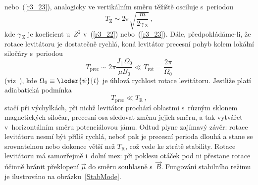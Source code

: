 nebo~(\ref{r3_23}), analogicky ve vertikálním směru těžiště osciluje
s~periodou
\begin{equation}
  T_{\mathrm{Z}}\sim 2\pi\sqrt{\frac{m}{2\gamma\,_{\mathrm{Z}}}}\,,    \label{r3_26}
\end{equation}
kde $\gamma\,_{\mathrm{Z}}$ je koeficient u~$Z^2$ v~(\ref{r3_22})
nebo~(\ref{r3_23}). Dále, předpokládáme-li, že rotace levitátoru je dostatečně
rychlá, koná levitátor precesní pohyb kolem lokální siločáry s~periodou
\begin{equation}
  T_{\mathrm{prec}} \sim 2\pi\frac{J_\parallel\,\Omega_0}{\mu B_0} \ll
  T_{\mathrm{rot}}= \frac{2\pi}{\Omega_{0}}                           \label{r3_27}
\end{equation}
(viz~\cite{Gol-Poo-Saf:2002:ClassMech:3}), kde $\Omega_0\equiv\loder{\psi}{t}$
je úhlová rychlost rotace levitátoru. Jestliže platí adiabatická podmínka
\begin{equation}
  T_{\mathrm{prec}} \ll T_{\mathrm{R}}\,,                                \label{r3_28}
\end{equation}
stačí při výchylkách, při nichž levitátor prochází oblastmi s~různým sklonem
magnetických siločar, precesní osa sledovat změnu jejich směru, a tak vytvářet
v~horizontálním směru potenciálovou jámu. Odtud plyne zajímavý závěr: rotace
levitátoru nesmí být příliš rychlá, neboť pak je precesní perioda dlouhá a
stane se srovnatelnou nebo dokonce větší než $T_{\mathrm{R}}$, což vede ke
ztrátě stability. Rotace levitátoru má samozřejmě i~dolní mez: při poklesu
otáček pod ni přestane rotace účinně bránit překlopení $\vec{\mu}$ do směru
souhlasně s~$\vec{B}$. Fungování stabilního režimu je ilustrováno na
obrázku~\ref{StabMode}.

\endinput

